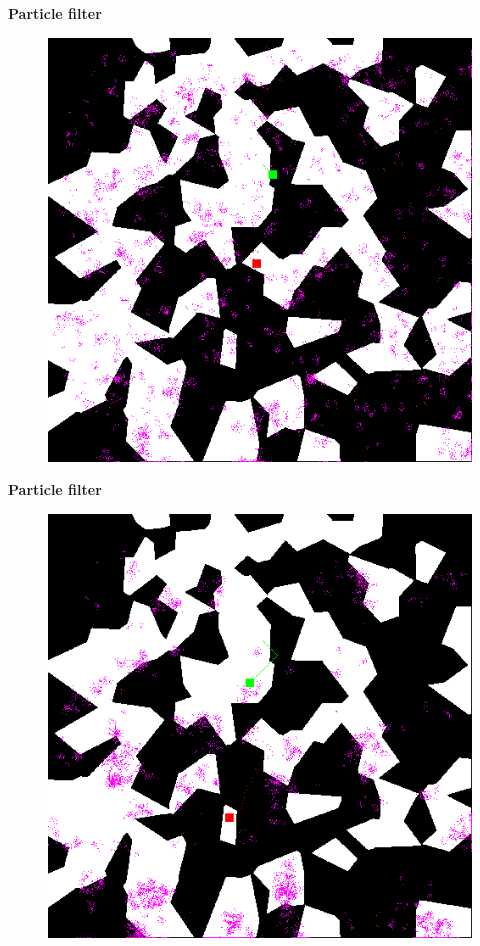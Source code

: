 \documentclass[xcolor=dvipsnames]{beamer}
\begin{document}
\begin{frame}{\bf Particle filter}

\begin{figure}[htbp]
  \centering
   \includegraphics[scale=0.4]{../pictures/00010.png}
\end{figure}

\end{frame}

\begin{frame}{\bf Particle filter}

\begin{figure}[htbp]
  \centering
   \includegraphics[scale=0.4]{../pictures/00040.png}
\end{figure}

\end{frame}
\end{document}
